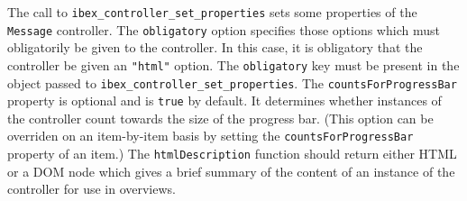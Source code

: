 \documentclass[
]{article}
\newenvironment{Shaded}{}{}
\newcommand{\AttributeTok}[1]{\textcolor[rgb]{0.49,0.56,0.16}{#1}}
\newcommand{\BuiltInTok}[1]{#1}
\newcommand{\CommentTok}[1]{\textcolor[rgb]{0.38,0.63,0.69}{\textit{#1}}}
\newcommand{\ControlFlowTok}[1]{\textcolor[rgb]{0.00,0.44,0.13}{\textbf{#1}}}
\newcommand{\DataTypeTok}[1]{\textcolor[rgb]{0.56,0.13,0.00}{#1}}
\newcommand{\DecValTok}[1]{\textcolor[rgb]{0.25,0.63,0.44}{#1}}
\newcommand{\FunctionTok}[1]{\textcolor[rgb]{0.02,0.16,0.49}{#1}}
\newcommand{\KeywordTok}[1]{\textcolor[rgb]{0.00,0.44,0.13}{\textbf{#1}}}
\newcommand{\NormalTok}[1]{#1}
\newcommand{\OperatorTok}[1]{\textcolor[rgb]{0.40,0.40,0.40}{#1}}
\newcommand{\StringTok}[1]{\textcolor[rgb]{0.25,0.44,0.63}{#1}}
\begin{document}
\begin{Shaded}
\end{Shaded}

The call to \texttt{ibex\_controller\_set\_properties} sets some
properties of the \texttt{Message} controller. The \texttt{obligatory}
option specifies those options which must obligatorily be given to the
controller. In this case, it is obligatory that the controller be given
an \texttt{"html"} option. The \texttt{obligatory} key must be present
in the object passed to \texttt{ibex\_controller\_set\_properties}. The
\texttt{countsForProgressBar} property is optional and is \texttt{true}
by default. It determines whether instances of the controller count
towards the size of the progress bar. (This option can be overriden on
an item-by-item basis by setting the \texttt{countsForProgressBar}
property of an item.) The \texttt{htmlDescription} function should
return either HTML or a DOM node which gives a brief summary of the
content of an instance of the controller for use in overviews.
\end{document}
